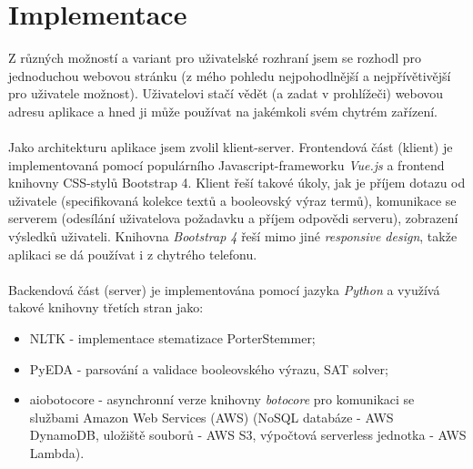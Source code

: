 \documentclass[a4paper,titlepage]{article}
\begin{document}
\section*{Implementace}

Z různých možností a variant pro uživatelské rozhraní jsem se rozhodl pro jednoduchou webovou stránku
(z mého pohledu nejpohodlnější a nejpřívětivější pro uživatele možnost).
Uživatelovi stačí vědět (a zadat v prohlížeči) webovou adresu aplikace a hned ji může používat
na jakémkoli svém chytrém zařízení.
\\~\\
Jako architekturu aplikace jsem zvolil klient-server. Frontendová část (klient) je implementovaná
pomocí populárního Javascript-frameworku \emph{Vue.js} a frontend knihovny CSS-stylů Bootstrap 4.
Klient řeší takové úkoly, jak je příjem dotazu od uživatele (specifikovaná kolekce textů
a booleovský výraz termů), komunikace se serverem (odesílání uživatelova požadavku a příjem odpovědi
serveru), zobrazení výsledků uživateli. Knihovna \emph{Bootstrap 4} řeší mimo jiné \emph{responsive design},
takže aplikaci se dá používat i z chytrého telefonu.
\\~\\
Backendová část (server) je implementována pomocí jazyka \emph{Python} a využívá
takové knihovny třetích stran jako:

\begin{itemize}
  \item NLTK - implementace stematizace PorterStemmer;
  \item PyEDA - parsování a validace booleovského výrazu, SAT solver;
  \item aiobotocore - asynchronní verze knihovny \emph{botocore} pro komunikaci
          se službami Amazon Web Services (AWS) (NoSQL databáze - AWS DynamoDB,
          uložiště souborů - AWS S3, výpočtová serverless jednotka - AWS Lambda).
\end{itemize}
\end{document}
